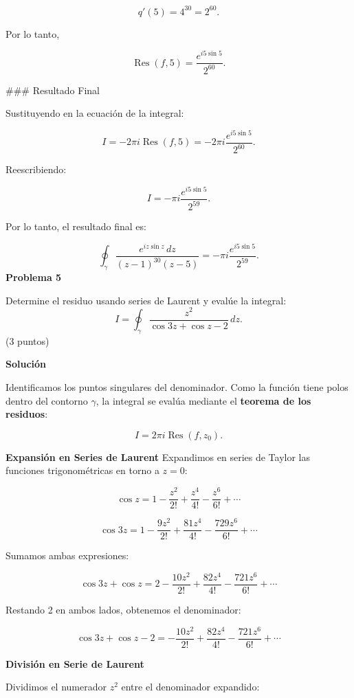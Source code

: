 \documentclass[a4paper,12pt]{article}
\begin{document}
\[
q'(5) = 4^{30} = 2^{60}.
\]

Por lo tanto,

\[
\operatorname{Res}(f, 5) = \frac{e^{i 5 \sin 5}}{2^{60}}.
\]

### Resultado Final

Sustituyendo en la ecuación de la integral:

\[
I = -2 \pi i \operatorname{Res}(f, 5) = -2 \pi i \frac{e^{i 5 \sin 5}}{2^{60}}.
\]

Reescribiendo:

\[
I = -\pi i \frac{e^{i 5 \sin 5}}{2^{59}}.
\]

Por lo tanto, el resultado final es:

\[
\oint_{\gamma} \frac{e^{i z \sin z} \, dz}{(z-1)^{30}(z-5)} = -\pi i \frac{e^{i 5 \sin 5}}{2^{59}}.
\]
{\bf Problema 5}

Determine el residuo usando series de Laurent y evalúe la integral:
\begin{equation}
    I = \oint_{\gamma} \frac{z^{2}}{\cos 3z + \cos z - 2} \, dz.  \nonumber
\end{equation}
(3 puntos)

{\bf Solución}

Identificamos los puntos singulares del denominador. Como la función tiene polos dentro del contorno \( \gamma \), la integral se evalúa mediante el \textbf{teorema de los residuos}:

\[
I = 2 \pi i \operatorname{Res}(f, z_0).
\]


{\bf Expansión en Series de Laurent}
Expandimos en series de Taylor las funciones trigonométricas en torno a \( z=0 \):

\[
\cos z = 1 - \frac{z^{2}}{2!} + \frac{z^{4}}{4!} - \frac{z^{6}}{6!} + \cdots
\]

\[
\cos 3z = 1 - \frac{9z^{2}}{2!} + \frac{81z^{4}}{4!} - \frac{729z^{6}}{6!} + \cdots
\]

Sumamos ambas expresiones:

\[
\cos 3z + \cos z = 2 - \frac{10z^{2}}{2!} + \frac{82z^{4}}{4!} - \frac{721z^{6}}{6!} + \cdots
\]

Restando 2 en ambos lados, obtenemos el denominador:

\[
\cos 3z + \cos z - 2 = -\frac{10z^{2}}{2!} + \frac{82z^{4}}{4!} - \frac{721z^{6}}{6!} + \cdots
\]


{\bf División en Serie de Laurent}

Dividimos el numerador \( z^2 \) entre el denominador expandido:
\end{document}
